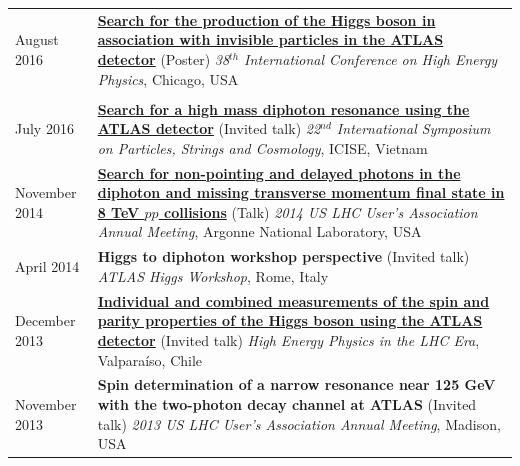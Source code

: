 \documentclass{letter}
\begin{document}
\begin{tabular}{p{}p{}}
	August 2016
	&
	\href{https://cds.cern.ch/record/2208271}{\textbf{Search for the production of the Higgs boson in association with invisible particles in the ATLAS detector}} (Poster) \newline 
	\textit{38$^{th}$ International Conference on High Energy Physics}, Chicago, USA \\
\\
	July 2016
	&
	\href{https://cds.cern.ch/record/2199807}{\textbf{Search for a high mass diphoton resonance using the ATLAS detector}} (Invited talk) \newline 
	\textit{22$^{nd}$ International Symposium on Particles, Strings and Cosmology}, ICISE, Vietnam \newline
\\
	November 2014
	&
	\href{https://indico.hep.anl.gov/indico/contributionDisplay.py?contribId=39&sessionId=0&confId=410}{\textbf{Search for non-pointing and delayed photons in the diphoton and missing transverse momentum final state in 8 TeV $pp$ collisions}} (Talk) \newline
	\textit{2014 US LHC User's Association Annual Meeting}, Argonne National Laboratory, USA \newline
\\
	April 2014
	&
	\textbf{Higgs to diphoton workshop perspective} (Invited talk) \newline
	\textit{ATLAS Higgs Workshop}, Rome, Italy \newline
\\
	December 2013
	&
	\href{https://cds.cern.ch/record/1640386}{\textbf{Individual and combined measurements of the spin and parity properties of the Higgs boson using the ATLAS detector}} (Invited talk) \newline
	\textit{High Energy Physics in the LHC Era}, Valpara\'{i}so, Chile \newline
\\
	November 2013
	&
	\textbf{Spin determination of a narrow resonance near 125 GeV with the two-photon decay channel at ATLAS} (Invited talk) \newline
	\textit{2013 US LHC User's Association Annual Meeting}, Madison, USA \newline

\end{tabular}
\end{document}
